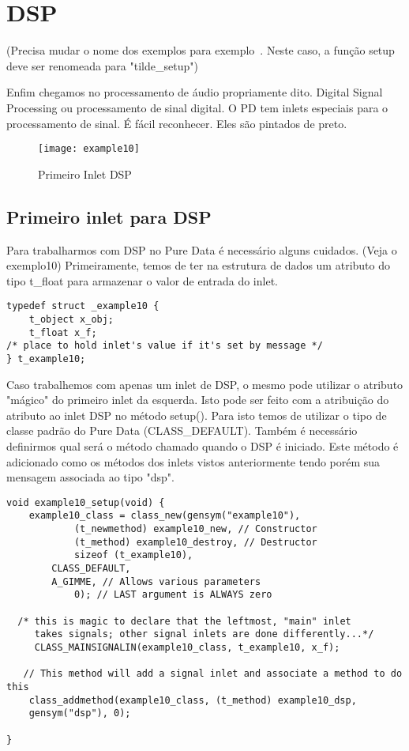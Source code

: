 
\chapter{DSP}
 (Precisa mudar o nome dos exemplos para exemplo~. Neste caso, a função setup deve ser renomeada para "tilde\_setup")

Enfim chegamos no processamento de áudio propriamente dito. Digital Signal Processing ou processamento de sinal digital. O PD tem inlets especiais para o processamento de sinal. É fácil reconhecer. Eles são pintados de preto.
\begin{figure}[h!]
	\centering
	\texttt{[image: example10]}
	\caption{Primeiro Inlet DSP}
\end{figure}

\section{Primeiro inlet para DSP}
Para trabalharmos com DSP no Pure Data é necessário alguns cuidados. (Veja o
exemplo10) Primeiramente, temos de ter na estrutura de dados um atributo do
tipo t\_float para armazenar o valor de entrada do inlet.

\begin{lstlisting}
typedef struct _example10 {
    t_object x_obj;
    t_float x_f;
/* place to hold inlet's value if it's set by message */
} t_example10;
\end{lstlisting}

Caso trabalhemos com apenas um inlet de DSP, o mesmo pode utilizar o atributo
"mágico" do primeiro inlet da esquerda. Isto pode ser feito com a atribuição do
atributo ao inlet DSP no método setup(). Para isto temos de utilizar o tipo de
classe padrão do Pure Data (CLASS\_DEFAULT). Também é necessário definirmos
qual será o método chamado quando o DSP é iniciado. Este método é adicionado
como os métodos dos inlets vistos anteriormente tendo porém sua mensagem
associada ao tipo "dsp".

\begin{lstlisting}
void example10_setup(void) {
    example10_class = class_new(gensym("example10"),
            (t_newmethod) example10_new, // Constructor
            (t_method) example10_destroy, // Destructor
            sizeof (t_example10),
	    CLASS_DEFAULT,
	    A_GIMME, // Allows various parameters
            0); // LAST argument is ALWAYS zero

  /* this is magic to declare that the leftmost, "main" inlet
     takes signals; other signal inlets are done differently...*/
     CLASS_MAINSIGNALIN(example10_class, t_example10, x_f);

   // This method will add a signal inlet and associate a method to do this
    class_addmethod(example10_class, (t_method) example10_dsp, 
	gensym("dsp"), 0); 

}
\end{lstlisting}
 
